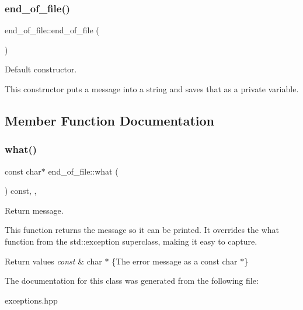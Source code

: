 \subsubsection{\texorpdfstring{end\+\_\+of\+\_\+file()}{end\_of\_file()}}
{\footnotesize\ttfamily end\+\_\+of\+\_\+file\+::end\+\_\+of\+\_\+file (\begin{DoxyParamCaption}{ }\end{DoxyParamCaption})\hspace{0.3cm}{\ttfamily [inline]}}



Default constructor. 

This constructor puts a message into a string and saves that as a private variable. 

\subsection{Member Function Documentation}
\mbox{\label{classend__of__file_a32e8c4c2f39a8484c2f39f9a98d5dfb8}} 
\subsubsection{\texorpdfstring{what()}{what()}}
{\footnotesize\ttfamily const char$\ast$ end\+\_\+of\+\_\+file\+::what (\begin{DoxyParamCaption}{ }\end{DoxyParamCaption}) const\hspace{0.3cm}{\ttfamily [inline]}, {\ttfamily [override]}, {\ttfamily [noexcept]}}



Return message. 

This function returns the message so it can be printed. It overrides the what function from the std\+::exception superclass, making it easy to capture.


\begin{DoxyRetVals}{Return values}
{\em const} & char $\ast$ \{The error message as a const char $\ast$\} \\
\hline
\end{DoxyRetVals}


The documentation for this class was generated from the following file\+:\begin{DoxyCompactItemize}
\item 
exceptions.\+hpp\end{DoxyCompactItemize}
